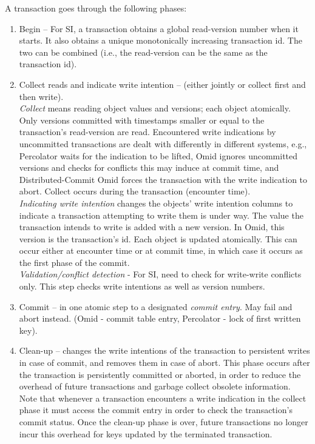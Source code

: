A transaction goes through the following phases:
\begin{enumerate}
  \item{Begin} -- For SI, a transaction obtains a global read-version number
  when it starts. It also obtains a unique monotonically increasing transaction id.
  The two can be combined (i.e., the read-version can be the same as the
  transaction id).
  \item{Collect reads and indicate write intention} -- (either jointly or
  collect first and then write).\\ \emph{Collect} means reading object values
  and versions; each object atomically. Only versions committed with timestamps
  smaller or equal to the transaction's read-version are read. Encountered write
  indications by uncommitted transactions are dealt with differently in
  different systems, e.g., Percolator waits for the indication to be lifted,
  Omid ignores uncommitted versions and checks for conflicts this may induce at
  commit time, and Distributed-Commit Omid forces the transaction with the write
  indication to abort. Collect occurs during the transaction (encounter time).\\
  \emph{Indicating write intention} changes the objects' write intention columns
  to indicate a transaction attempting to write them is under way. The value the
  transaction intends to write is added with a new version. In Omid, this
  version is the transaction's id. Each object is updated atomically. This can
  occur either at encounter time or at commit time, in which case it occurs as
  the first phase of the commit. \\
  \emph{Validation/conflict detection} - For SI, need
  to check for write-write conflicts only. This step checks write intentions as well as version numbers.
  \item{Commit} --  in one atomic step to a designated \emph{commit entry}. May
  fail and abort instead. (Omid - commit table entry, Percolator - lock of first written key).
  \item{Clean-up} -- changes the write intentions of the transaction to
  persistent writes in case of commit, and removes them in case of abort. This
  phase occurs after the transaction is persistently committed or aborted, in
  order to reduce the overhead of future transactions and garbage collect
  obsolete information. Note that whenever a transaction encounters a write
  indication in the collect phase it must access the commit entry in order to
  check the transaction's commit status. Once the clean-up phase is over, future
  transactions no longer incur this overhead for keys updated by the terminated
  transaction.
\end{enumerate}


